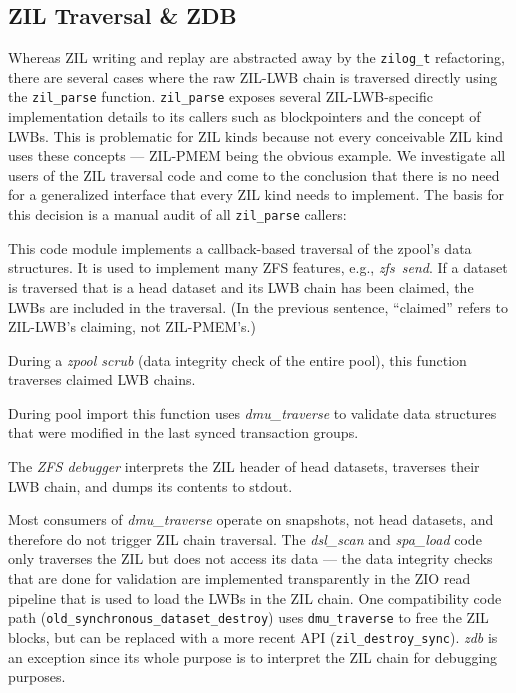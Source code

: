 \documentclass[12pt,a4paper,twoside]{book}
\begin{document}
\subsection{ZIL Traversal \& ZDB}\label{sec:zil_kinds:traversal}
Whereas ZIL writing and replay are abstracted away by the \lstinline{zilog_t} refactoring, there are several cases where the raw ZIL-LWB chain is traversed directly using the \lstinline{zil_parse} function.
\lstinline{zil_parse} exposes several ZIL-LWB-specific implementation details to its callers such as blockpointers and the concept of LWBs.
This is problematic for ZIL kinds because not every conceivable ZIL kind uses these concepts --- ZIL-PMEM being the obvious example.
We investigate all users of the ZIL traversal code and come to the conclusion that there is no need for a generalized interface that every ZIL kind needs to implement.
The basis for this decision is a manual audit of all \lstinline{zil_parse} callers:
\begin{description}[noitemsep]
    \item[dmu\_traverse] This code module implements a callback-based traversal of the zpool's data structures.
    It is used to implement many ZFS features, e.g., \mbox{\textit{zfs send}}.
    If a dataset is traversed that is a head dataset and its LWB chain has been claimed, the LWBs are included in the traversal.
    (In the previous sentence, ``claimed'' refers to ZIL-LWB's claiming, not ZIL-PMEM's.)
    \item[dsl\_scan\_zil] During a \textit{zpool scrub} (data integrity check of the entire pool), this function traverses claimed LWB chains.
    \item[spa\_load\_verify] During pool import this function uses \textit{dmu\_traverse} to validate data structures that were modified in the last synced transaction groups.
    \item[zdb\_il.c] The \textit{ZFS debugger} interprets the ZIL header of head datasets, traverses their LWB chain, and dumps its contents to stdout.
\end{description}
Most consumers of \textit{dmu\_traverse} operate on snapshots, not head datasets, and therefore do not trigger ZIL chain traversal.
The \textit{dsl\_scan} and \textit{spa\_load} code only traverses the ZIL but does not access its data --- the data integrity checks that are done for validation are implemented transparently in the ZIO read pipeline that is used to load the LWBs in the ZIL chain.
One compatibility code path (\lstinline{old_synchronous_dataset_destroy}) uses \lstinline{dmu_traverse} to free the ZIL blocks, but can be replaced with a more recent API (\lstinline{zil_destroy_sync}).
\textit{zdb} is an exception since its whole purpose is to interpret the ZIL chain for debugging purposes.
\end{document}
